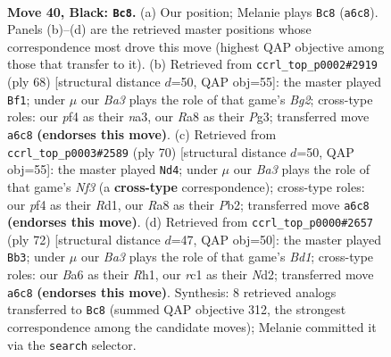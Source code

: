\documentclass[11pt]{article}
\begin{document}
\clearpage

\begin{figure}[p]\centering
\begin{subfigure}{0.46\textwidth}\centering
\resizebox{\linewidth}{!}{%
\newchessgame
\chessboard[
  setfen={r7/p2p2k1/bpp5/5p1p/1PP1nP2/NB6/P2PK2P/2R5 b - - 5 40},
  showmover=false,
  pgfstyle=straightmove, color=movearrow, markmove={a6-c8}
]}
\caption{}
\end{subfigure}\hfill
\begin{subfigure}{0.46\textwidth}\centering
\resizebox{\linewidth}{!}{%
\newchessgame
\chessboard[
  setfen={6k1/1b3pp1/p3p2p/P2pN3/3P3P/n3P1P1/5PB1/6K1 w - - 0 35},
  showmover=false,
  pgfstyle=straightmove, color=movearrow, markmove={g2-f1}
]}
\caption{}
\end{subfigure}
\\[4pt]
\begin{subfigure}{0.46\textwidth}\centering
\resizebox{\linewidth}{!}{%
\newchessgame
\chessboard[
  setfen={2k5/2p1bn1r/1p2p3/5p2/1P3P1p/5N1P/1P3BP1/3R1K2 w - - 1 36},
  showmover=false,
  pgfstyle=straightmove, color=movearrow, markmove={f3-d4}
]}
\caption{}
\end{subfigure}\hfill
\begin{subfigure}{0.46\textwidth}\centering
\resizebox{\linewidth}{!}{%
\newchessgame
\chessboard[
  setfen={k6r/3n4/2p2pb1/1p4pp/3PP3/2P3P1/1K1N2P1/3B3R w - - 0 37},
  showmover=false,
  pgfstyle=straightmove, color=movearrow, markmove={d1-b3}
]}
\caption{}
\end{subfigure}
\caption{\textbf{Move 40, Black: \texttt{Bc8}.} (a) Our position; Melanie plays \texttt{Bc8} (\texttt{a6c8}). Panels (b)--(d) are the retrieved master positions whose correspondence most drove this move (highest QAP objective among those that transfer to it). (b) Retrieved from \texttt{ccrl\_top\_p0002\#2919} (ply 68) [structural distance $d$=50, QAP obj=55]: the master played \texttt{Bf1}; under $\mu$ our \emph{Ba3} plays the role of that game's \emph{Bg2}; cross-type roles: our \emph{p}f4 as their \emph{n}a3, our \emph{R}a8 as their \emph{P}g3; transferred move \texttt{a6c8} \textbf{(endorses this move)}. (c) Retrieved from \texttt{ccrl\_top\_p0003\#2589} (ply 70) [structural distance $d$=50, QAP obj=55]: the master played \texttt{Nd4}; under $\mu$ our \emph{Ba3} plays the role of that game's \emph{Nf3} (a \textbf{cross-type} correspondence); cross-type roles: our \emph{p}f4 as their \emph{R}d1, our \emph{R}a8 as their \emph{P}b2; transferred move \texttt{a6c8} \textbf{(endorses this move)}. (d) Retrieved from \texttt{ccrl\_top\_p0000\#2657} (ply 72) [structural distance $d$=47, QAP obj=50]: the master played \texttt{Bb3}; under $\mu$ our \emph{Ba3} plays the role of that game's \emph{Bd1}; cross-type roles: our \emph{B}a6 as their \emph{R}h1, our \emph{r}c1 as their \emph{N}d2; transferred move \texttt{a6c8} \textbf{(endorses this move)}. Synthesis: 8 retrieved analogs transferred to \texttt{Bc8} (summed QAP objective 312, the strongest correspondence among the candidate moves); Melanie committed it via the \texttt{search} selector.}
\label{fig:thought-m79}
\end{figure}
\end{document}
